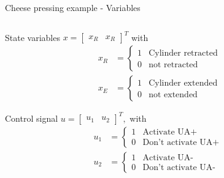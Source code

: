 \documentclass[presentation,aspectratio=1610]{beamer}
\begin{document}
\begin{frame}[label={sec:org51f1787}]{Cheese pressing example - Variables}
\begin{columns}
\begin{column}{0.5\columnwidth}
\begin{block}{State variables}
\(x = \begin{bmatrix} x_R & x_R \end{bmatrix}^T\) with
\begin{align*}
x_R &= \begin{cases} 1 & \text{Cylinder retracted}\\0 & \text{not retracted}\end{cases}\\
x_E &= \begin{cases} 1 & \text{Cylinder extended}\\0 & \text{not extended}\end{cases}
\end{align*}
\end{block}
\begin{block}{Control signal}
\(u = \begin{bmatrix} u_1 & u_2 \end{bmatrix}^T,\) with
\begin{align*}
u_1 &= \begin{cases} 1 & \text{Activate UA+}\\0 & \text{Don't activate UA+ }\end{cases}\\
u_2 &= \begin{cases} 1 & \text{Activate UA-}\\0 & \text{Don't activate UA-}\end{cases}
\end{align*}
\end{block}
\end{column}


\end{columns}
\end{frame}
\end{document}

